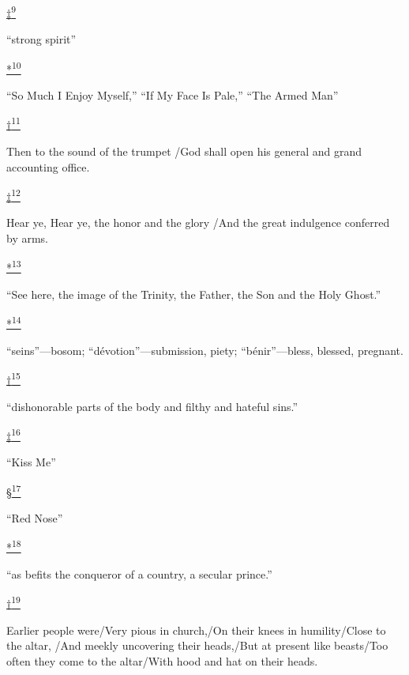 \protect\hypertarget{23_NOTES.xhtmlux5cux23id_3006}{\protect\hyperlink{13_Chapter_Six__THE_DEPICTION_OF_TH.xhtmlux5cux23id_3005}{‡\textsuperscript{9}}}
``strong spirit''

\protect\hypertarget{23_NOTES.xhtmlux5cux23id_3008}{\protect\hyperlink{13_Chapter_Six__THE_DEPICTION_OF_TH.xhtmlux5cux23id_3007}{*\textsuperscript{10}}}
``So Much I Enjoy Myself,'' ``If My Face Is Pale,'' ``The Armed Man''

\protect\hypertarget{23_NOTES.xhtmlux5cux23id_3010}{\protect\hyperlink{13_Chapter_Six__THE_DEPICTION_OF_TH.xhtmlux5cux23id_3009}{†\textsuperscript{11}}}
Then to the sound of the trumpet /God shall open his general and grand
accounting office.

\protect\hypertarget{23_NOTES.xhtmlux5cux23id_3012}{\protect\hyperlink{13_Chapter_Six__THE_DEPICTION_OF_TH.xhtmlux5cux23id_3011}{‡\textsuperscript{12}}}
Hear ye, Hear ye, the honor and the glory /And the great indulgence
conferred by arms.

\protect\hypertarget{23_NOTES.xhtmlux5cux23id_3014}{\protect\hyperlink{13_Chapter_Six__THE_DEPICTION_OF_TH.xhtmlux5cux23id_3013}{*\textsuperscript{13}}}
``See here, the image of the Trinity, the Father, the Son and the Holy
Ghost.''

\protect\hypertarget{23_NOTES.xhtmlux5cux23id_3016}{\protect\hyperlink{13_Chapter_Six__THE_DEPICTION_OF_TH.xhtmlux5cux23id_3015}{*\textsuperscript{14}}}
``seins''---bosom; ``dévotion''---submission, piety; ``bénir''---bless,
blessed, pregnant.

\protect\hypertarget{23_NOTES.xhtmlux5cux23id_3018}{\protect\hyperlink{13_Chapter_Six__THE_DEPICTION_OF_TH.xhtmlux5cux23id_3017}{†\textsuperscript{15}}}
``dishonorable parts of the body and filthy and hateful sins.''

\protect\hypertarget{23_NOTES.xhtmlux5cux23id_3020}{\protect\hyperlink{13_Chapter_Six__THE_DEPICTION_OF_TH.xhtmlux5cux23id_3019}{‡\textsuperscript{16}}}
``Kiss Me''

\protect\hypertarget{23_NOTES.xhtmlux5cux23id_3022}{\protect\hyperlink{13_Chapter_Six__THE_DEPICTION_OF_TH.xhtmlux5cux23id_3021}{§\textsuperscript{17}}}
``Red Nose''

\protect\hypertarget{23_NOTES.xhtmlux5cux23id_3024}{\protect\hyperlink{13_Chapter_Six__THE_DEPICTION_OF_TH.xhtmlux5cux23id_3023}{*\textsuperscript{18}}}
``as befits the conqueror of a country, a secular prince.''

\protect\hypertarget{23_NOTES.xhtmlux5cux23id_3026}{\protect\hyperlink{13_Chapter_Six__THE_DEPICTION_OF_TH.xhtmlux5cux23id_3025}{†\textsuperscript{19}}}
Earlier people were/Very pious in church,/On their knees in
humility/Close to the altar, /And meekly uncovering their heads,/But at
present like beasts/Too often they come to the altar/With hood and hat
on their heads.

